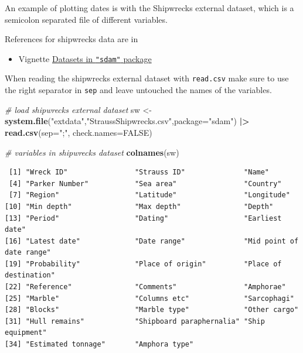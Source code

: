 \documentclass[a4paper,11pt]{memoir}
\newenvironment{Shaded}{\begin{snugshade}}{\end{snugshade}}
\newcommand{\CommentTok}[1]{\textcolor[rgb]{0.56,0.35,0.01}{\textit{#1}}}
\newcommand{\DataTypeTok}[1]{\textcolor[rgb]{0.13,0.29,0.53}{#1}}
\newcommand{\ErrorTok}[1]{\textcolor[rgb]{0.64,0.00,0.00}{\textbf{#1}}}
\newcommand{\KeywordTok}[1]{\textcolor[rgb]{0.13,0.29,0.53}{\textbf{#1}}}
\newcommand{\NormalTok}[1]{#1}
\newcommand{\OperatorTok}[1]{\textcolor[rgb]{0.81,0.36,0.00}{\textbf{#1}}}
\newcommand{\OtherTok}[1]{\textcolor[rgb]{0.56,0.35,0.01}{#1}}
\newcommand{\StringTok}[1]{\textcolor[rgb]{0.31,0.60,0.02}{#1}}
\providecommand{\tightlist}{%
  \setlength{\itemsep}{0pt}\setlength{\parskip}{0pt}}
\begin{document}
An example of plotting dates is with the Shipwrecks external dataset,
which is a semicolon separated file of different variables.

References for shipwrecks data are in

\begin{itemize}
\tightlist
\item
  Vignette \href{../doc/Intro.html}{Datasets in \texttt{"sdam"} package}
\end{itemize}

When reading the shipwrecks external dataset with \texttt{read.csv} make
sure to use the right separator in \texttt{sep} and leave untouched the
names of the variables.

\begin{Shaded}
\begin{Highlighting}[]
\CommentTok{# load shipwrecks external dataset}
\NormalTok{sw <-}\StringTok{ }\KeywordTok{system.file}\NormalTok{(}\StringTok{"extdata"}\NormalTok{,}\StringTok{"StraussShipwrecks.csv"}\NormalTok{,}\DataTypeTok{package=}\StringTok{"sdam"}\NormalTok{) }\OperatorTok{|}\ErrorTok{>}\StringTok{ }
\StringTok{  }\KeywordTok{read.csv}\NormalTok{(}\DataTypeTok{sep=}\StringTok{";"}\NormalTok{, }\DataTypeTok{check.names=}\OtherTok{FALSE}\NormalTok{)}
\end{Highlighting}
\end{Shaded}

\begin{Shaded}
\begin{Highlighting}[]
\CommentTok{# variables in shipwrecks dataset}
\KeywordTok{colnames}\NormalTok{(sw)}
\end{Highlighting}
\end{Shaded}

\begin{verbatim}
 [1] "Wreck ID"                "Strauss ID"              "Name"                   
 [4] "Parker Number"           "Sea area"                "Country"                
 [7] "Region"                  "Latitude"                "Longitude"              
[10] "Min depth"               "Max depth"               "Depth"                  
[13] "Period"                  "Dating"                  "Earliest date"          
[16] "Latest date"             "Date range"              "Mid point of date range"
[19] "Probability"             "Place of origin"         "Place of destination"   
[22] "Reference"               "Comments"                "Amphorae"               
[25] "Marble"                  "Columns etc"             "Sarcophagi"             
[28] "Blocks"                  "Marble type"             "Other cargo"            
[31] "Hull remains"            "Shipboard paraphernalia" "Ship equipment"         
[34] "Estimated tonnage"       "Amphora type"           
\end{verbatim}
\end{document}
